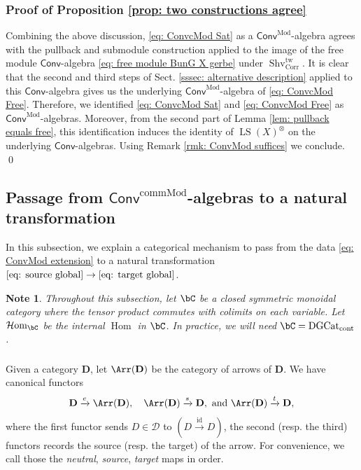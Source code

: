 \documentclass[10pt]{amsart}
\newcommand{\sssec}{\subsubsection}
\newtheorem{note}[subsubsection]{Note}
\theoremstyle{remark}
\newcommand{\te}{\text}
\newcommand{\on}{\operatorname}
\newcommand{\cD}{\mathcal{D}}
\newcommand{\DGcat}{\on{DGCat}_{\on{cont}}}
\newcommand{\Shv}{\on{Shv}}
\newcommand{\LS}{\on{LS}}
\DeclareMathOperator{\Hom}{Hom}
\DeclareMathOperator{\cHom}{\mathcal{H}om}
\newcommand{\id}{\on{id}}
\newcommand{\bD}{\mathbf{D}}
\newcommand{\Conv}{\mathsf{Conv}}
\newcommand{\ConvMod}{\mathsf{Conv}^{\on{Mod}}}
\newcommand{\ConvcMod}{\mathsf{Conv}^{\on{commMod}}}
\newcommand{\Corr}{\on{Corr}}
\begin{document}
\sssec{Proof of Proposition \ref{prop: two constructions agree}}
    Combining the above discussion, \eqref{eq: ConvcMod Sat} as a $\ConvMod$-algebra agrees with the pullback and submodule construction applied to the image of the free module $\Conv$-algebra \eqref{eq: free module BunG X gerbe} under $\Shv^{\on{tw}}_{\Corr}$.
   It is clear that the second and third steps of Sect. \ref{sssec: alternative description} applied to this $\Conv$-algebra gives us the underlying $\ConvMod$-algebra of \eqref{eq: ConvcMod Free}. Therefore, we identified \eqref{eq: ConvcMod Sat} and \eqref{eq: ConvcMod Free} as $\ConvMod$-algebras. Moreover, from the second part of Lemma \ref{lem: pullback equals free}, this identification induces the identity of $\LS(X)^{\otimes}$ on the underlying $\Conv$-algebras. Using Remark \ref{rmk: ConvMod suffices} we conclude. \qed







\subsection{Passage from $\ConvcMod$-algebras to a natural transformation}\label{ssec: passage ConvcMod nat transf}
In this subsection, we explain a categorical mechanism to pass from the data \eqref{eq: ConvMod extension} to a natural transformation $\eqref{eq: source global}\rightarrow \eqref{eq: target global}$.

\begin{note}
    Throughout this subsection, let $\bC$ be a closed symmetric monoidal category where the tensor product commutes with colimits on each variable. Let $\cHom_{\bC}$ be the internal $\Hom$ in $\bC$. In practice, we will need $\bC=\DGcat$. 
\end{note}

\sssec{}
Given a category $\bD$, let $\Arr(\bD)$ be the category of arrows of $\bD$.
We have canonical functors
\[\bD\xrightarrow{e} \Arr(\bD),\quad \Arr(\bD)\xrightarrow{s} \bD,\ \te{and }\Arr(\bD)\xrightarrow{t} \bD,\]
where the first functor sends $D\in \cD$ to $(D\xrightarrow{\id} D)$, the second (resp. the third) functors records the source (resp. the target) of the arrow. For convenience, we call those the \emph{neutral}, \emph{source}, \emph{target} maps in order.
\end{document}
